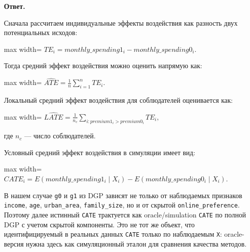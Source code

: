 \documentclass[11pt]{article}
\begin{document}
\textbf{Ответ.}

Сначала рассчитаем индивидуальные эффекты воздействия как разность двух
потенциальных исходов:

\begin{center}
\begin{adjustbox}{max width=\linewidth}
\(\displaystyle TE_i = monthly\_spending1_i - monthly\_spending0_i.\)
\end{adjustbox}
\end{center}

Тогда средний эффект воздействия можно оценить напрямую как:

\begin{center}
\begin{adjustbox}{max width=\linewidth}
\(\displaystyle \widehat{ATE} = \frac{1}{n}\sum\limits_{i=1}^{n} TE_i.\)
\end{adjustbox}
\end{center}

Локальный средний эффект воздействия для соблюдателей оценивается как:

\begin{center}
\begin{adjustbox}{max width=\linewidth}
\(\displaystyle \widehat{LATE} = \frac{1}{n_c}\sum\limits_{i: premium1_i > premium0_i} TE_i,\)
\end{adjustbox}
\end{center}

где \(n_c\) --- число соблюдателей.

Условный средний эффект воздействия в симуляции имеет вид:

\begin{center}
\begin{adjustbox}{max width=\linewidth}
\(\displaystyle CATE_i = E(monthly\_spending1_i \mid X_i) - E(monthly\_spending0_i \mid X_i).\)
\end{adjustbox}
\end{center}

В нашем случае \texttt{g0} и \texttt{g1} из DGP зависят не только от
наблюдаемых признаков \texttt{income}, \texttt{age},
\texttt{urban\_area}, \texttt{family\_size}, но и от скрытой
\texttt{online\_preference}. Поэтому далее истинный \texttt{CATE}
трактуется как oracle/simulation \texttt{CATE} по полной DGP с учетом
скрытой компоненты. Это не тот же объект, что идентифицируемый в
реальных данных \texttt{CATE} только по наблюдаемым \texttt{X}:
oracle-версия нужна здесь как симуляционный эталон для сравнения
качества методов.
\end{document}
